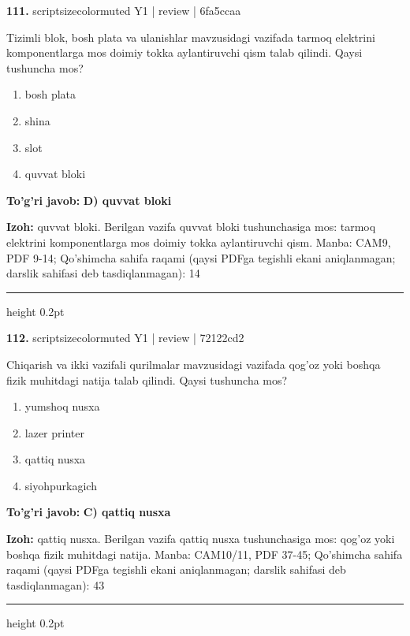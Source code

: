 \documentclass[10pt,a4paper]{article}
\begin{document}
{\bfseries\sffamily\color{ink} 111.} {scriptsizecolor{muted} Y1 | review | 6fa5ccaa}
\par
Tizimli blok, bosh plata va ulanishlar mavzusidagi vazifada tarmoq elektrini komponentlarga mos doimiy tokka aylantiruvchi qism talab qilindi. Qaysi tushuncha mos?
\begin{enumerate}[label=\Alph*),leftmargin=9mm]
\item bosh plata
\item shina
\item slot
\item quvvat bloki
\end{enumerate}
\begin{tcolorbox}[enhanced,breakable,colback=teal!4,colframe=teal!60!black,boxrule=0.45pt,arc=1.2mm,left=2.7mm,right=2.7mm,top=1.8mm,bottom=1.8mm,before skip=2mm,after skip=2mm]
{\bfseries\sffamily\color{teal}To'g'ri javob:} \textbf{D) quvvat bloki}
\par\smallskip
{\bfseries Izoh:} quvvat bloki. Berilgan vazifa quvvat bloki tushunchasiga mos: tarmoq elektrini komponentlarga mos doimiy tokka aylantiruvchi qism. Manba: CAM9, PDF 9-14; Qo'shimcha sahifa raqami (qaysi PDFga tegishli ekani aniqlanmagan; darslik sahifasi deb tasdiqlanmagan): 14
\end{tcolorbox}
\vspace{2mm}\hrule height 0.2pt\vspace{3mm}

{\bfseries\sffamily\color{ink} 112.} {scriptsizecolor{muted} Y1 | review | 72122cd2}
\par
Chiqarish va ikki vazifali qurilmalar mavzusidagi vazifada qog'oz yoki boshqa fizik muhitdagi natija talab qilindi. Qaysi tushuncha mos?
\begin{enumerate}[label=\Alph*),leftmargin=9mm]
\item yumshoq nusxa
\item lazer printer
\item qattiq nusxa
\item siyohpurkagich
\end{enumerate}
\begin{tcolorbox}[enhanced,breakable,colback=teal!4,colframe=teal!60!black,boxrule=0.45pt,arc=1.2mm,left=2.7mm,right=2.7mm,top=1.8mm,bottom=1.8mm,before skip=2mm,after skip=2mm]
{\bfseries\sffamily\color{teal}To'g'ri javob:} \textbf{C) qattiq nusxa}
\par\smallskip
{\bfseries Izoh:} qattiq nusxa. Berilgan vazifa qattiq nusxa tushunchasiga mos: qog'oz yoki boshqa fizik muhitdagi natija. Manba: CAM10/11, PDF 37-45; Qo'shimcha sahifa raqami (qaysi PDFga tegishli ekani aniqlanmagan; darslik sahifasi deb tasdiqlanmagan): 43
\end{tcolorbox}
\vspace{2mm}\hrule height 0.2pt\vspace{3mm}
\end{document}
